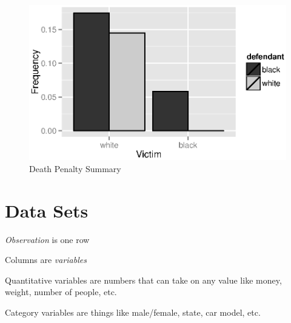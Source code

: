\documentclass{exam}
\begin{document}
  \begin{figure}[H]
    \centering
    \includegraphics[scale = 0.9]{figures/death_penalty.eps}
    \caption{Death Penalty Summary}
  \end{figure}

  \section{Data Sets}
  \begin{itemize*}
    \item {\em Observation} is one row
    \item Columns are {\em variables}
    \item Quantitative variables are numbers that can take on any value like money, weight, number of people, etc.
    \item Category variables are things like male/female, state, car model, etc.
  \end{itemize*}
\end{document}
